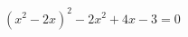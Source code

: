 \begin{ex}[type=equation]
	\begin{condition}
		$(x^2 - 2x)^2 - 2x^2 + 4x - 3 = 0$
	\end{condition}
\end{ex}